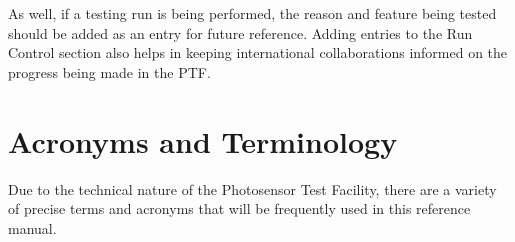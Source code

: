\documentclass[twoside,letterpaper]{refart}
\begin{document}
As well, if a testing run is being performed, the reason and feature being tested should be added as an entry for future reference. Adding entries to the Run Control section also helps in keeping international collaborations informed on the progress being made in the PTF.


\newpage

\appendix

\section{Acronyms and Terminology}\label{Terminology}

Due to the technical nature of the Photosensor Test Facility, there are a variety of precise terms and acronyms that will be frequently used in this reference manual.
\end{document}
